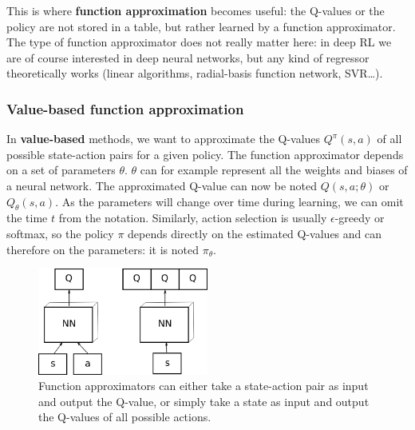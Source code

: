 \documentclass[
  letterpaper,
  DIV=11,
  numbers=noendperiod]{scrreprt}
\begin{document}
This is where \textbf{function approximation} becomes useful: the
Q-values or the policy are not stored in a table, but rather learned by
a function approximator. The type of function approximator does not
really matter here: in deep RL we are of course interested in deep
neural networks, but any kind of regressor theoretically works (linear
algorithms, radial-basis function network, SVR\ldots).

\hypertarget{value-based-function-approximation}{%
\subsubsection*{Value-based function
approximation}\label{value-based-function-approximation}}

In \textbf{value-based} methods, we want to approximate the Q-values
\(Q^\pi(s,a)\) of all possible state-action pairs for a given policy.
The function approximator depends on a set of parameters \(\theta\).
\(\theta\) can for example represent all the weights and biases of a
neural network. The approximated Q-value can now be noted
\(Q(s, a ;\theta)\) or \(Q_\theta(s, a)\). As the parameters will change
over time during learning, we can omit the time \(t\) from the notation.
Similarly, action selection is usually \(\epsilon\)-greedy or softmax,
so the policy \(\pi\) depends directly on the estimated Q-values and can
therefore on the parameters: it is noted \(\pi_\theta\).

\begin{figure}

{\centering \includegraphics[width=0.5\textwidth,height=\textheight]{./img/functionapprox.png}

}

\caption{\label{fig-functionapprox}Function approximators can either
take a state-action pair as input and output the Q-value, or simply take
a state as input and output the Q-values of all possible actions.}

\end{figure}
\end{document}
